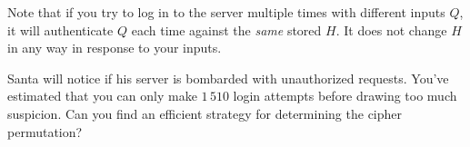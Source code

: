 Note that if you try to log in to the server multiple times with different inputs $Q$, it will authenticate $Q$ each time against the \emph{same} stored $H$. It does not change $H$ in any way in response to your inputs.

Santa will notice if his server is bombarded with unauthorized requests. You've estimated that you can only make $1\,510$ login attempts before drawing too much suspicion. Can you find an efficient strategy for determining the cipher permutation?

